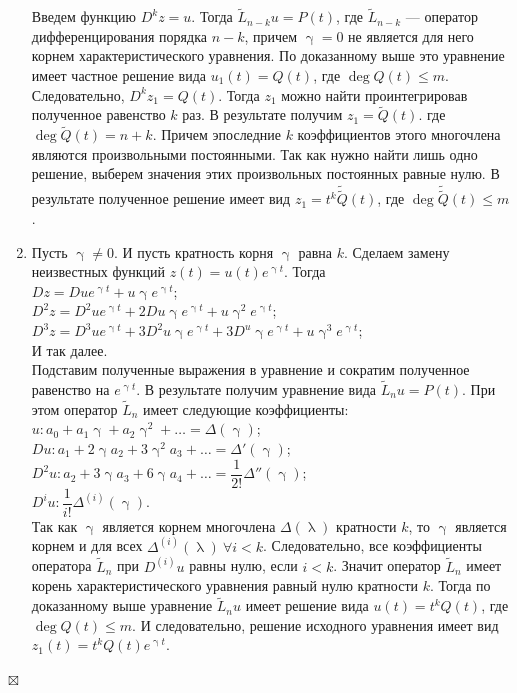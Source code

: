\documentclass[a4paper, 12pt]{report}
\newenvironment{Proof} %
{\par\noindent{$\blacklozenge$}} %
{\hfill$\scriptstyle\boxtimes$}
\renewcommand{\lambda}{\uplambda}
\begin{document}
\begin{Proof}
\begin{enumerate}
	Введем функцию $D^kz = u$. Тогда $\widetilde{L}_{n-k}u = P(t)$, где $\widetilde{L}_{n-k}$ --- оператор дифференцирования порядка $n-k$, причем $\upgamma = 0$ не является для него корнем характеристического уравнения. По доказанному выше это уравнение имеет частное решение вида $u_1(t) = Q(t)$, где $\deg Q(t) \leqslant m$. Следовательно, $D^kz_1 = Q(t)$. Тогда $z_1$ можно найти проинтегрировав полученное равенство $k$ раз. В результате получим $z_1 = \widetilde{Q}(t)$. где $\deg \widetilde{Q}(t) = n + k$. Причем эпоследние $k$ коэффициентов этого многочлена являются произвольными постоянными. Так как нужно найти лишь одно решение, выберем значения этих произвольных постоянных равные нулю. В результате полученное решение имеет вид $z_1 = t^k\widetilde{\widetilde{Q}}(t)$, где $\deg \widetilde{\widetilde{Q}}(t) \leqslant m$.
	\item Пусть $\upgamma \ne 0$. И пусть кратность корня $\upgamma$ равна $k$. Сделаем замену неизвестных функций $z(t) = u(t)e^{\upgamma t}$. Тогда\\
	$Dz = Due^{\upgamma t} + u \upgamma e ^{\upgamma t}$;\\
	$D^2 z = D^2 u e^{\upgamma t} + 2 D u \upgamma e^{\upgamma t} + u\upgamma^2 e^{\upgamma t}$;\\
	$D^3 z = D^3 u e^{\upgamma t} + 3 D^2 u \upgamma e^{\upgamma t} + 3 D^ u \upgamma e^{\upgamma t}+ u\upgamma^3 e^{\upgamma t}$;\\
	И так далее.\\
	Подставим полученные выражения в уравнение и сократим полученное равенство на $e^{\upgamma t}$. В результате получим уравнение вида $\widetilde{L}_nu = P(t)$. При этом оператор $\widetilde{L}_n$ имеет следующие коэффициенты:\\
	$u : a_0 + a_1 \upgamma + a_2 \upgamma^2 + \ldots = \Delta (\upgamma)$;\\
	$Du : a_1 + 2\upgamma a_2 + 3\upgamma^2a_3 + \ldots = \Delta' (\upgamma)$;\\
	$D^2 u : a_2 + 3\upgamma a_3 + 6\upgamma a_4 + \ldots = \dfrac{1}{2!}\Delta''(\upgamma)$;\\
	$D^i u: \dfrac{1}{i!}\Delta^{(i)}(\upgamma).$\\
	Так как $\upgamma$ является корнем многочлена $\Delta(\lambda)$ кратности $k$, то $\upgamma$ является корнем и для всех $\Delta^{(i)}(\lambda)\ \forall i < k$. Следовательно, все коэффициенты оператора $\widetilde{L}_n$ при $D^{(i)}u$ равны нулю, если $i < k$. Значит оператор $\widetilde{L}_n$ имеет корень характеристического уравнения равный нулю кратности $k$. Тогда по доказанному выше уравнение $\widetilde{L}_n u$ имеет решение вида $u(t) = t^k Q(t)$, где $\deg Q(t)\leqslant m$. И следовательно, решение исходного уравнения имеет вид $z_1(t) = t^k Q(t)e^{\upgamma t}$.
\end{enumerate}
\end{Proof}
\end{document}
